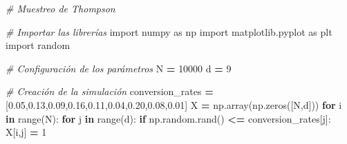 \documentclass[
]{book}
\newenvironment{Shaded}{\begin{snugshade}}{\end{snugshade}}
\newcommand{\BuiltInTok}[1]{#1}
\newcommand{\CommentTok}[1]{\textcolor[rgb]{0.56,0.35,0.01}{\textit{#1}}}
\newcommand{\ControlFlowTok}[1]{\textcolor[rgb]{0.13,0.29,0.53}{\textbf{#1}}}
\newcommand{\DecValTok}[1]{\textcolor[rgb]{0.00,0.00,0.81}{#1}}
\newcommand{\FloatTok}[1]{\textcolor[rgb]{0.00,0.00,0.81}{#1}}
\newcommand{\ImportTok}[1]{#1}
\newcommand{\KeywordTok}[1]{\textcolor[rgb]{0.13,0.29,0.53}{\textbf{#1}}}
\newcommand{\NormalTok}[1]{#1}
\newcommand{\OperatorTok}[1]{\textcolor[rgb]{0.81,0.36,0.00}{\textbf{#1}}}
\begin{document}
\begin{Shaded}
\begin{Highlighting}[]
\CommentTok{\# Muestreo de Thompson}

\CommentTok{\# Importar las librerías}
\ImportTok{import}\NormalTok{ numpy }\ImportTok{as}\NormalTok{ np}
\ImportTok{import}\NormalTok{ matplotlib.pyplot }\ImportTok{as}\NormalTok{ plt}
\ImportTok{import}\NormalTok{ random}

\CommentTok{\# Configuración de los parámetros}
\NormalTok{N }\OperatorTok{=} \DecValTok{10000}
\NormalTok{d }\OperatorTok{=} \DecValTok{9}

\CommentTok{\# Creación de la simulación}
\NormalTok{conversion\_rates }\OperatorTok{=}\NormalTok{ [}\FloatTok{0.05}\NormalTok{,}\FloatTok{0.13}\NormalTok{,}\FloatTok{0.09}\NormalTok{,}\FloatTok{0.16}\NormalTok{,}\FloatTok{0.11}\NormalTok{,}\FloatTok{0.04}\NormalTok{,}\FloatTok{0.20}\NormalTok{,}\FloatTok{0.08}\NormalTok{,}\FloatTok{0.01}\NormalTok{]}
\NormalTok{X }\OperatorTok{=}\NormalTok{ np.array(np.zeros([N,d]))}
\ControlFlowTok{for}\NormalTok{ i }\KeywordTok{in} \BuiltInTok{range}\NormalTok{(N):}
    \ControlFlowTok{for}\NormalTok{ j }\KeywordTok{in} \BuiltInTok{range}\NormalTok{(d):}
        \ControlFlowTok{if}\NormalTok{ np.random.rand() }\OperatorTok{\textless{}=}\NormalTok{ conversion\_rates[j]:}
\NormalTok{            X[i,j] }\OperatorTok{=} \DecValTok{1}


\end{Highlighting}
\end{Shaded}
\end{document}
